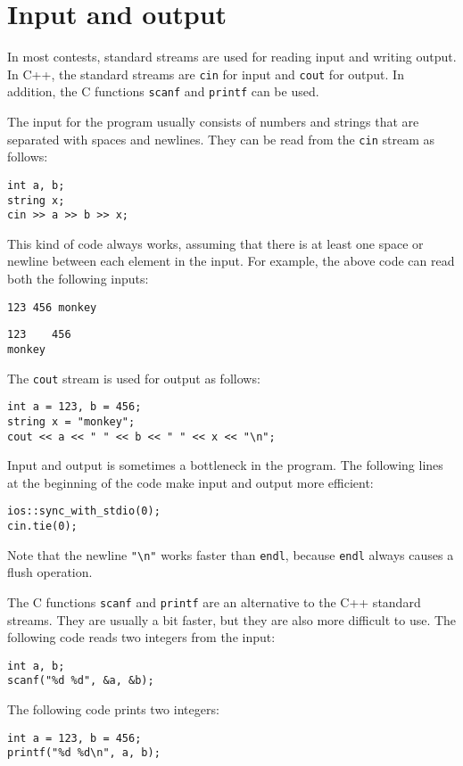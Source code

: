 \section{Input and output}


In most contests, standard streams are used for
reading input and writing output.
In C++, the standard streams are
\texttt{cin} for input and \texttt{cout} for output.
In addition, the C functions
\texttt{scanf} and \texttt{printf} can be used.

The input for the program usually consists of
numbers and strings that are separated with
spaces and newlines.
They can be read from the \texttt{cin} stream
as follows:

\begin{lstlisting}
int a, b;
string x;
cin >> a >> b >> x;
\end{lstlisting}

This kind of code always works,
assuming that there is at least one space
or newline between each element in the input.
For example, the above code can read
both the following inputs:
\begin{lstlisting}
123 456 monkey
\end{lstlisting}
\begin{lstlisting}
123    456
monkey
\end{lstlisting}
The \texttt{cout} stream is used for output
as follows:
\begin{lstlisting}
int a = 123, b = 456;
string x = "monkey";
cout << a << " " << b << " " << x << "\n";
\end{lstlisting}

Input and output is sometimes
a bottleneck in the program.
The following lines at the beginning of the code
make input and output more efficient:

\begin{lstlisting}
ios::sync_with_stdio(0);
cin.tie(0);
\end{lstlisting}

Note that the newline \texttt{"\textbackslash n"}
works faster than \texttt{endl},
because \texttt{endl} always causes
a flush operation.

The C functions \texttt{scanf}
and \texttt{printf} are an alternative
to the C++ standard streams.
They are usually a bit faster,
but they are also more difficult to use.
The following code reads two integers from the input:
\begin{lstlisting}
int a, b;
scanf("%d %d", &a, &b);
\end{lstlisting}
The following code prints two integers:
\begin{lstlisting}
int a = 123, b = 456;
printf("%d %d\n", a, b);
\end{lstlisting}

